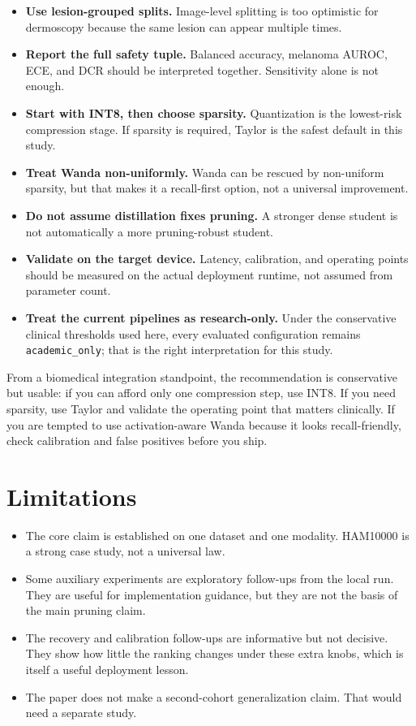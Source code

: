 \documentclass{article}
\newcommand{\DCR}{\ensuremath{\mathrm{DCR}}}
\begin{document}
\begin{itemize}[leftmargin=*,itemsep=2pt,topsep=2pt]
  \item \textbf{Use lesion-grouped splits.} Image-level splitting is too optimistic for dermoscopy because the same lesion can appear multiple times.
  \item \textbf{Report the full safety tuple.} Balanced accuracy, melanoma AUROC, ECE, and \DCR{} should be interpreted together. Sensitivity alone is not enough.
  \item \textbf{Start with INT8, then choose sparsity.} Quantization is the lowest-risk compression stage. If sparsity is required, Taylor is the safest default in this study.
  \item \textbf{Treat Wanda non-uniformly.} Wanda can be rescued by non-uniform sparsity, but that makes it a recall-first option, not a universal improvement.
  \item \textbf{Do not assume distillation fixes pruning.} A stronger dense student is not automatically a more pruning-robust student.
  \item \textbf{Validate on the target device.} Latency, calibration, and operating points should be measured on the actual deployment runtime, not assumed from parameter count.
  \item \textbf{Treat the current pipelines as research-only.} Under the conservative clinical thresholds used here, every evaluated configuration remains \texttt{academic\_only}; that is the right interpretation for this study.
\end{itemize}

From a biomedical integration standpoint, the recommendation is conservative but usable: if you can afford only one compression step, use INT8. If you need sparsity, use Taylor and validate the operating point that matters clinically. If you are tempted to use activation-aware Wanda because it looks recall-friendly, check calibration and false positives before you ship.

\section{Limitations}
\begin{itemize}[leftmargin=*,itemsep=2pt,topsep=2pt]
  \item The core claim is established on one dataset and one modality. HAM10000 is a strong case study, not a universal law.
  \item Some auxiliary experiments are exploratory follow-ups from the local run. They are useful for implementation guidance, but they are not the basis of the main pruning claim.
  \item The recovery and calibration follow-ups are informative but not decisive. They show how little the ranking changes under these extra knobs, which is itself a useful deployment lesson.
  \item The paper does not make a second-cohort generalization claim. That would need a separate study.
\end{itemize}
\end{document}
